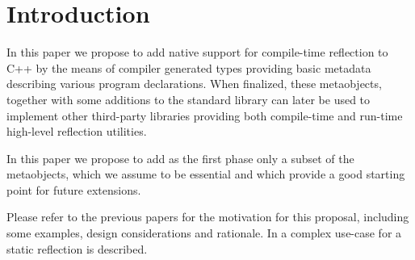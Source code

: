 \section{Introduction}

In this paper we propose to add native support for
compile-time reflection to C++ by the means of compiler generated
types providing basic metadata describing various program declarations.
When finalized, these metaobjects, together with some additions to the standard
library can later be used to implement other third-party libraries
providing both compile-time and run-time high-level
reflection utilities.

In this paper we propose to add as the first phase
only a subset of the metaobjects, which we assume to be essential
and which provide a good starting point for future extensions.

Please refer to the previous papers \cite{n3996,n4111,n4451,n4452}
for the motivation for this proposal, including some examples,
design considerations and rationale. In \cite{ITFPWTHOR} a complex use-case
for a static reflection is described.

